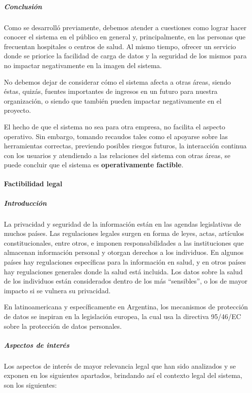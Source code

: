 \subparagraph{Conclusión}

Como se desarrolló previamente, debemos atender a cuestiones como lograr hacer conocer el sistema en el público en general y, principalmente, en las personas que frecuentan hospitales o centros de salud.
Al mismo tiempo, ofrecer un servicio donde se priorice la facilidad de carga de datos y la seguridad de los mismos para no impactar negativamente en la imagen del sistema.

No debemos dejar de considerar cómo el sistema afecta a otras áreas, siendo éstas, quizás, fuentes importantes de ingresos en un futuro para nuestra organización, o siendo que también pueden impactar negativamente en el proyecto.

El hecho de que el sistema no sea para otra empresa, no facilita el aspecto operativo.
Sin embargo, tomando recaudos tales como el apoyarse sobre las herramientas correctas, previendo posibles riesgos futuros, la interacción continua con los usuarios y atendiendo a las relaciones del sistema con otras áreas, se puede concluir que el sistema es \textbf{operativamente factible}.


\paragraph{Factibilidad legal}

\subparagraph{Introducción}

La privacidad y seguridad de la información están en las agendas legislativas de muchos países. Las regulaciones legales surgen en forma de leyes, actas, artículos constitucionales, entre otros, e imponen responsabilidades a las instituciones que almacenan información personal y otorgan derechos a los individuos. En algunos países hay regulaciones específicas para la información en salud, y en otros países hay regulaciones generales donde la salud está incluida. Los datos sobre la salud de los individuos están considerados dentro de los más ``sensibles'', o los de mayor impacto si se vulnera su privacidad.

En latinoamericana y específicamente en Argentina, los mecanismos de protección de datos se inspiran en la legislación europea, la cual usa la directiva 95/46/EC sobre la protección de datos personales.


\subparagraph{Aspectos de interés}

Los aspectos de interés de mayor relevancia legal que han sido analizados y se exponen en los siguientes apartados, brindando así el contexto legal del sistema, son los siguientes:

